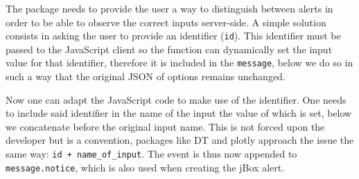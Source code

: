 \documentclass[
]{krantz}
\makeatletter
\newenvironment{Shaded}{\begin{snugshade}}{\end{snugshade}}
\newcommand{\CommentTok}[1]{\textcolor[rgb]{0.37,0.37,0.37}{\textit{#1}}}
\newcommand{\ControlFlowTok}[1]{\textcolor[rgb]{0.27,0.27,0.27}{\textbf{#1}}}
\newcommand{\DataTypeTok}[1]{\textcolor[rgb]{0.27,0.27,0.27}{#1}}
\newcommand{\KeywordTok}[1]{\textcolor[rgb]{0.27,0.27,0.27}{\textbf{#1}}}
\newcommand{\NormalTok}[1]{#1}
\newcommand{\OperatorTok}[1]{\textcolor[rgb]{0.43,0.43,0.43}{\textbf{#1}}}
\newcommand{\StringTok}[1]{\textcolor[rgb]{0.5,0.5,0.5}{#1}}
\newenvironment{kframe}{%
\medskip{}
\setlength{\fboxsep}{.8em}
 \def\at@end@of@kframe{}%
 \ifinner\ifhmode%
  \def\at@end@of@kframe{\end{minipage}}%
  \begin{minipage}{\columnwidth}%
 \fi\fi%
 \def\FrameCommand##1{\hskip\@totalleftmargin \hskip-\fboxsep
 \colorbox{shadecolor}{##1}\hskip-\fboxsep
     \hskip-\linewidth \hskip-\@totalleftmargin \hskip\columnwidth}%
 \MakeFramed {\advance\hsize-\width
   \@totalleftmargin\z@ \linewidth\hsize
   \@setminipage}}%
 {\par\unskip\endMakeFramed%
 \at@end@of@kframe}
\renewenvironment{Shaded}{\begin{kframe}}{\end{kframe}}
\makeatother
\begin{document}
The package needs to provide the user a way to distinguish between alerts in order to be able to observe the correct inputs server-side.
A simple solution consists in asking the user to provide an identifier (\texttt{id}). This identifier must be passed to the JavaScript client so the function can dynamically set the input value for that identifier, therefore it is included in the \texttt{message}, below we do so in such a way that the original JSON of options remains unchanged.

\begin{Shaded}
\end{Shaded}

Now one can adapt the JavaScript code to make use of the identifier. One needs to include said identifier in the name of the input the value of which is set, below we concatenate before the original input name. This is not forced upon the developer but is a convention, packages like DT and plotly approach the issue the same way: \texttt{id\ +\ name\_of\_input}. The event is thus now appended to \texttt{message.notice}, which is also used when creating the jBox alert.
\end{document}
